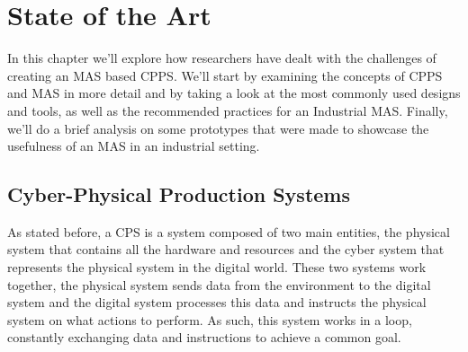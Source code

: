 

\glsresetall

\chapter{State of the Art}
\label{cha:state-of-the-art}

In this chapter we'll explore how researchers have dealt with the challenges of creating an \gls{MAS} based \gls{CPPS}. We'll start by  examining the concepts of \gls{CPPS} and \gls{MAS} in more detail and by taking a look at the most commonly used designs and tools, as well as the recommended practices for an Industrial \gls{MAS}. Finally, we'll do a brief analysis on some prototypes that were made to showcase the usefulness of an MAS in an industrial setting.

\section{Cyber-Physical Production Systems}
\label{sec:cyber-physical_production_systems}

As stated before, a \Gls{CPS} is a system composed of two main entities, the physical system that contains all the hardware and resources and the cyber system that represents the physical system in the digital world. These two systems work together, the physical system sends data from the environment to the digital system and the digital system processes this data and instructs the physical system on what actions to perform. As such, this system works in a loop, constantly exchanging data and instructions to achieve a common goal.\\

